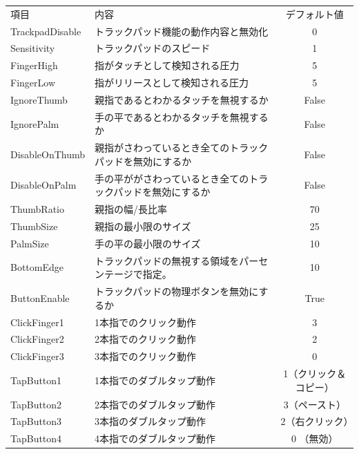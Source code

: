 \documentclass[mingoth,a4paper]{jsarticle}
\begin{document}
\begin{table}[htb]
  \begin{tabular}{llc}
    項目 & 内容 & デフォルト値 \\
    TrackpadDisable & トラックパッド機能の動作内容と無効化 & 0 \\
    Sensitivity & トラックパッドのスピード & 1 \\
    FingerHigh & 指がタッチとして検知される圧力 & 5 \\
    FingerLow & 指がリリースとして検知される圧力 & 5 \\
    IgnoreThumb & 親指であるとわかるタッチを無視するか & False \\
    IgnorePalm & 手の平であるとわかるタッチを無視するか & False \\
    DisableOnThumb & 親指がさわっているとき全てのトラックパッドを無効にするか & False \\
    DisableOnPalm & 手の平ががさわっているとき全てのトラックパッドを無効にするか & False \\
    ThumbRatio & 親指の幅/長比率 & 70 \\
    ThumbSize & 親指の最小限のサイズ & 25 \\
    PalmSize & 手の平の最小限のサイズ & 10 \\
    BottomEdge & トラックパッドの無視する領域をパーセンテージで指定。 & 10\\
    ButtonEnable & トラックパッドの物理ボタンを無効にするか & True \\
    ClickFinger1 & 1本指でのクリック動作 & 3 \\
    ClickFinger2 & 2本指でのクリック動作 & 2 \\
    ClickFinger3 & 3本指でのクリック動作 & 0 \\
    TapButton1 & 1本指でのダブルタップ動作 & 1（クリック＆コピー）\\
    TapButton2 & 2本指でのダブルタップ動作 & 3（ペースト）\\
    TapButton3 & 3本指のダブルタップ動作 & 2（右クリック）\\
    TapButton4 & 4本指でのダブルタップ動作 & 0 （無効）\\

\end{tabular}
\end{table}
\end{document}
